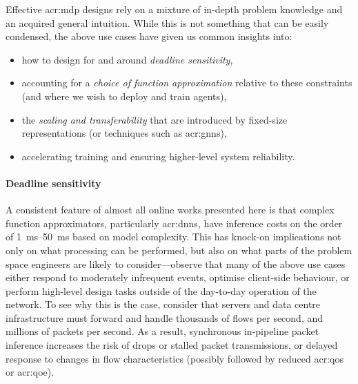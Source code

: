 Effective \gls{acr:mdp} designs rely on a mixture of in-depth problem knowledge and an acquired general intuition.
While this is not something that can be easily condensed, the above use cases have given us common insights into:
\begin{itemize}
	\item how to design for and around \emph{deadline sensitivity},
	\item accounting for a \emph{choice of function approximation} relative to these constraints (and where we wish to deploy and train agents),
	\item the \emph{scaling and transferability} that are introduced by fixed-size representations (or techniques such as \glspl{acr:gnn}),
	\item accelerating training and ensuring higher-level system reliability.
\end{itemize}

\paragraph{Deadline sensitivity}\label{testtt}
A consistent feature of almost all online works presented here is that complex function approximators, particularly \glspl{acr:dnn}, have inference costs on the order of \qtyrange{1}{50}{\milli\second} based on model complexity.
This has knock-on implications not only on what processing can be performed, but also on what parts of the problem space engineers are likely to consider---observe that many of the above use cases either respond to moderately infrequent events, optimise client-side behaviour, or perform high-level design tasks outside of the day-to-day operation of the network.
To see why this is the case, consider that servers and data centre infrastructure must forward and handle thousands of flows per second, and millions of packets per second.
As a result, synchronous in-pipeline packet inference increases the risk of drops or stalled packet transmissions, or delayed response to changes in flow characteristics (possibly followed by reduced \gls{acr:qos} or \gls{acr:qoe}).

